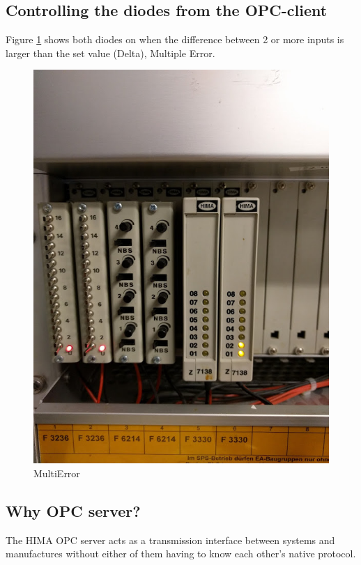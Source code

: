 \subsection{Controlling the diodes from the OPC-client}
Figure \ref{Eq:2}  shows both diodes on when the difference between 2 or more inputs is larger than the set value (Delta), Multiple Error.
\begin{figure}[!htb]
    \centering
    \includegraphics[scale=0.4]{images/ME}
     \caption{MultiError}
     \label{Eq:2}
\end{figure}

\subsection{Why OPC server?}
The HIMA OPC server acts as a transmission interface between 
systems and manufactures without either of them having to know each other's native protocol.

